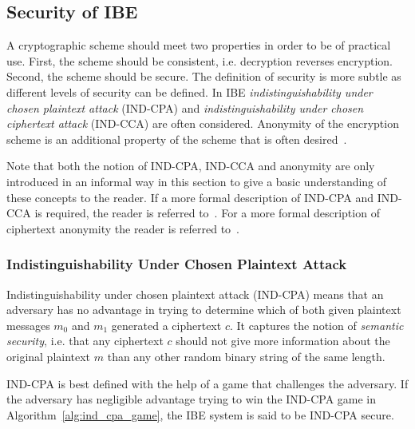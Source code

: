 \subsection{Security of IBE}
A cryptographic scheme should meet two properties in order to be of practical use. First, the scheme should be consistent, i.e. decryption reverses encryption. Second, the scheme should be secure. The definition of security is more subtle as different levels of security can be defined. In IBE \textit{indistinguishability under chosen plaintext attack} (IND-CPA) and \textit{indistinguishability under chosen ciphertext attack} (IND-CCA) are often considered. Anonymity of the encryption scheme is an additional property of the scheme that is often desired~\cite{thesis:Alfredo08}.

Note that both the notion of IND-CPA, IND-CCA and anonymity are only introduced in an informal way in this section to give a basic understanding of these concepts to the reader. If a more formal description of IND-CPA and IND-CCA is required, the reader is referred to~\cite{art:BonehF01}. For a more formal description of ciphertext anonymity the reader is referred to~\cite{art:AbdallaBCKKLMNPS05}.

\subsubsection{Indistinguishability Under Chosen Plaintext Attack}
Indistinguishability under chosen plaintext attack (IND-CPA) means that an adversary has no advantage in trying to determine which of both given plaintext messages $m_0$ and $m_1$ generated a ciphertext $c$. It captures the notion of \textit{semantic security}, i.e. that any ciphertext $c$ should not give more information about the original plaintext $m$ than any other random binary string of the same length.

IND-CPA is best defined with the help of a game that challenges the adversary. If the adversary has negligible advantage trying to win the IND-CPA game in Algorithm~\ref{alg:ind_cpa_game}, the IBE system is said to be IND-CPA secure.


